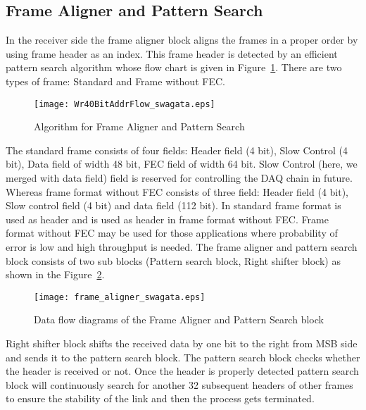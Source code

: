 \documentclass[10pt, conference, compsocconf]{IEEEtran}
\begin{document}
\subsection{Frame Aligner and Pattern Search} \label{FrameAligner}
In the receiver side the frame aligner block aligns the frames in a proper order by using frame header as an index. This frame header is detected by an efficient pattern search algorithm whose flow chart is given in Figure~\ref{fig:FrameAlignerFlow}. There are two types of frame: Standard and Frame without FEC.\begin{figure}[t!]
\centering
\texttt{[image: Wr40BitAddrFlow\_swagata.eps]}
\vspace*{-10pt}
\caption{Algorithm for Frame Aligner and Pattern Search}
\vspace*{-5pt}
\label{fig:FrameAlignerFlow}
\end{figure}
The standard frame consists of four fields: Header field (4 bit), Slow Control (4 bit), Data field of width 48 bit, FEC field of width 64 bit. 
Slow Control (here, we merged with data field) field is reserved for controlling the DAQ chain in future.
Whereas frame format without FEC consists of three field: Header field (4 bit), Slow control field (4 bit) and data field (112 bit). In standard frame format  is used as header and  is used as header in frame format without FEC. Frame format without FEC may be used for those applications where probability of error is low and high throughput is needed. The frame aligner and pattern search block consists of two sub blocks (Pattern search block, Right shifter block) as shown in the Figure~\ref{fig:FrameAlignerWork}.
\begin{figure}[t!]
\centering
\texttt{[image: frame\_aligner\_swagata.eps]}
\vspace{-5 pt}
\caption{Data flow diagrams of the Frame Aligner and Pattern Search block}
\vspace{-10 pt}
\label{fig:FrameAlignerWork}
\end{figure}
  Right shifter block shifts the received data by one bit to the right from MSB side and sends it to the pattern search block. The pattern search block checks whether the header is received or not. Once the header is properly detected pattern search block will continuously search for another 32 subsequent headers of other frames to ensure the stability of the link and then the process gets terminated.
\end{document}
